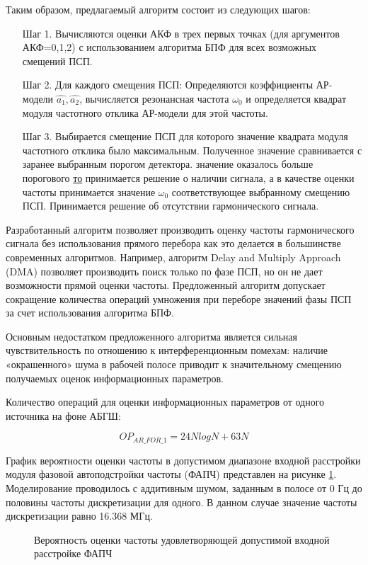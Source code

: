 Таким образом, предлагаемый алгоритм состоит из следующих шагов:

\begin{itemize}
\item[Шаг 1.] Вычисляются оценки  АКФ в трех первых точках (для аргументов АКФ=0,1,2)
	с использованием алгоритма БПФ для всех возможных смещений ПСП. 
\item[Шаг 2.] Для каждого смещения ПСП: 
	Определяются коэффициенты АР-модели ${\hat{a_1}, \hat{a_2}}$,
	вычисляется резонансная частота ${\omega_0}$
	и определяется квадрат модуля частотного отклика АР-модели для этой частоты. 
\item[Шаг 3.] Выбирается смещение ПСП для которого значение квадрата модуля частотного отклика было максимальным. Полученное значение сравнивается с заранее выбранным порогом детектора. 
	  значение оказалось больше порогового {\underline{то}} 
		принимается решение о наличии сигнала, а в качестве оценки
		частоты принимается значение ${\omega_0}$ соответствующее выбранному смещению ПСП. 
		Принимается решение об отсутствии гармонического сигнала.
\end{itemize}

Разработанный алгоритм позволяет производить оценку частоты гармонического сигнала без использования прямого перебора как это делается в большинстве современных алгоритмов.
Например, алгоритм Delay and Multiply Approach (DMA) позволяет производить поиск только по фазе ПСП, но он не дает возможности прямой оценки частоты. 
Предложенный алгоритм допускает сокращение количества операций умножения при переборе значений фазы ПСП за счет использования алгоритма БПФ.

Основным недостатком предложенного алгоритма является сильная чувствительность по отношению к интерференционным помехам: наличие «окрашенного» шума в рабочей полосе приводит к
значительному смещению получаемых оценок информационных параметров.

Количество операций для оценки информационных параметров от одного источника на фоне АБГШ:
\begin{center}
\begin{equation}
	OP_{AR\_FOR\_1} = 24NlogN + 63N
\end{equation}
\end{center}

График вероятности оценки частоты в допустимом диапазоне входной расстройки модуля фазовой автоподстройки частоты (ФАПЧ) представлен на рисунке
\ref{pic:lpc_for_1_probability}. Моделирование проводилось с аддитивным шумом, заданным в полосе от 0 Гц до
половины частоты дискретизации для одного. В данном случае значение частоты дискретизации равно 16.368 МГц.
\begin{figure}[H]
\center{}
	\caption{Вероятность оценки частоты удовлетворяющей допустимой входной расстройке ФАПЧ}
	\label{pic:lpc_for_1_probability}
\end{figure}

